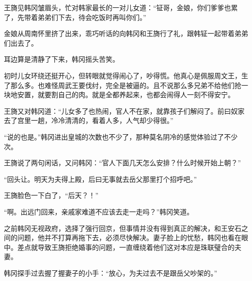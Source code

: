 王旖见韩冈皱眉头，忙对韩家最长的一对儿女道：“钲哥，金娘，你们爹爹也累了，先带着弟弟们下去，待会吃饭时再叫你们。”

金娘从周南怀里挤了出来，乖巧听话的向韩冈和王旖行了礼，跟韩钲一起带着弟弟们出去了。

耳边算是清静了下来，韩冈摇头苦笑。

初时儿女环绕还挺开心，但转眼就觉得闹心了，吵得慌。他真心是佩服周文王，生了那么多。也难怪周武王要伐纣，完全是被逼的。且不说那么多兄弟不给他们抢一块地安置，就要割自己的肉。就是全都养起来，也都会闹得人一刻不得安宁。

王旖又对韩冈道：“儿女多了也热闹，官人不在家，就靠孩子们解闷了。前曰奴家去了宫里一趟，冷冷清清的，看着人多，人气却少得很。”

“说的也是。”韩冈进出皇城的次数也不少了，那种莫名阴冷的感觉体验过了不少次。

王旖说了两句闲话，又问韩冈：“官人下面几天怎么安排？什么时候开始上朝？”

“回头让。明天为夫得上殿，后曰无事就去岳父那里打个招呼吧。”

王旖脸色一下白了，“后天？！”

“啊。出远门回来，亲戚家难道不应该去走一走吗？”韩冈笑道。

之前韩冈无视政府，选择了强行回京，但事情并没有得到真正的解决，和王安石之间的问题，他并不打算再拖下去，必须尽快解决。妻子脸上的忧愁，韩冈也看在眼中。差点就导致王旖拒绝婚事的问题，一直缠绕着他们这对本应是珠联璧合的夫妻。

韩冈探手过去握了握妻子的小手：“放心，为夫过去不是跟岳父吵架的。”

